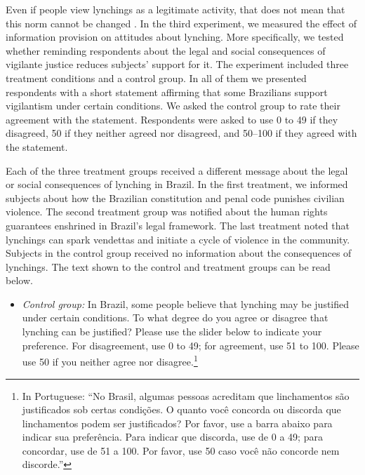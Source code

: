 \documentclass[12pt,ansiapaper]{article}
\providecommand{\tightlist}{%
   \setlength{\itemsep}{0pt}\setlength{\parskip}{0pt}}
\begin{document}
Even if people view lynchings as a legitimate activity, that does not mean that this norm cannot be changed \citep{weaver2019judge}. In the third experiment, we measured the effect of information provision on attitudes about lynching. More specifically, we tested whether reminding respondents about the legal and social consequences of vigilante justice reduces subjects' support for it. The experiment included three treatment conditions and a control group. In all of them we presented respondents with a short statement affirming that some Brazilians support vigilantism under certain conditions. We asked the control group to rate their agreement with the statement. Respondents were asked to use 0 to 49 if they disagreed, 50 if they neither agreed nor disagreed, and 50--100 if they agreed with the statement.

Each of the three treatment groups received a different message about the legal or social consequences of lynching in Brazil. In the first treatment, we informed subjects about how the Brazilian constitution and penal code punishes civilian violence. The second treatment group was notified about the human rights guarantees enshrined in Brazil's legal framework. The last treatment noted that lynchings can spark vendettas and initiate a cycle of violence in the community. Subjects in the control group received no information about the consequences of lynchings. The text shown to the control and treatment groups can be read below.

\begin{itemize}
\tightlist
\item
  \emph{Control group:} In Brazil, some people believe that lynching may be justified under certain conditions. To what degree do you agree or disagree that lynching can be justified? Please use the slider below to indicate your preference. For disagreement, use 0 to 49; for agreement, use 51 to 100. Please use 50 if you neither agree nor disagree.\footnote{In Portuguese: ``No Brasil, algumas pessoas acreditam que linchamentos são justificados sob certas condições. O quanto você concorda ou discorda que linchamentos podem ser justificados? Por favor, use a barra abaixo para indicar sua preferência. Para indicar que discorda, use de 0 a 49; para concordar, use de 51 a 100. Por favor, use 50 caso você não concorde nem discorde.''}
\end{itemize}
\end{document}
